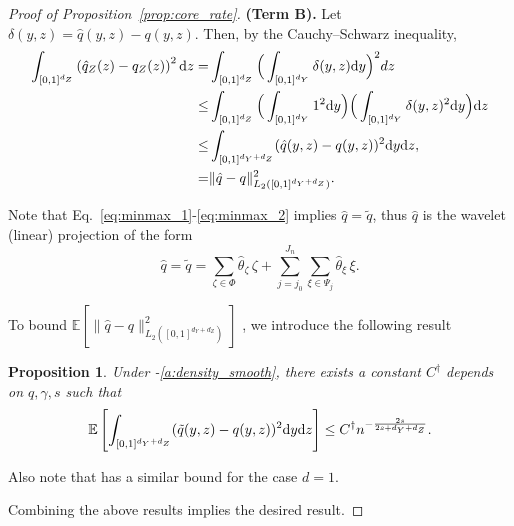 \documentclass{article}
\theoremstyle{plain}
\newtheorem{proposition}{Proposition}[section]
\theoremstyle{definition}
\def\EE{\mathbb{E}}
\theoremstyle{plain}
\newcommand{\diff}{{\rm d}}
\def\EE{\mathbb{E}}
\begin{document}
\begin{proof}[Proof of Proposition~\ref{prop:core_rate}]
    \medskip
    \noindent
    \textbf{(Term B).}
    Let $\delta(y,z)=\hat q(y,z)-q(y,z)$. Then, by the Cauchy–Schwarz inequality,
    \begin{align*}
        \int_{[0,1]^{d_Z}}  \left(\hat q_Z(z) - q_Z(z)\right)^2  \diff z
        = & \int_{[0,1]^{d_Z}} \Big(\int_{[0,1]^{d_Y}} \delta(y,z) \diff y\Big)^2 dz\\
    \le & \int_{[0,1]^{d_Z}} \Big(\int_{[0,1]^{d_Y}} 1^2 \diff y\Big)\Big(\int_{[0,1]^{d_Y}} \delta(y,z)^2\diff y\Big)\diff z\\
    \le & \int_{[0,1]^{d_Y + d_Z}} (\hat q(y,z)-q(y,z))^2  \diff y \diff z,\\
    =& \|\hat q - q\|^2_{L_2([0,1]^{d_Y + d_Z})}.
    \end{align*}
    

    Note that Eq.~\eqref{eq:minmax_1}-\eqref{eq:minmax_2} implies $\hat q = \tilde q$, thus $\hat q$ is the wavelet (linear) projection of the form
    \[
        \hat q = \tilde q = \sum_{\zeta\in\Phi}\widehat \theta_\zeta\,\zeta
+
\sum_{j=j_0}^{J_n}\sum_{\xi\in\Psi_j}\widehat \theta_\xi\,\xi.
    \]

    To bound $\EE\left[\|\hat q - q\|^2_{L_2([0,1]^{d_Y + d_Z})}\right]$ , we introduce the following result
    \begin{proposition}\label{prop:L2-bound}
    Under -\ref{a:density_smooth}, there exists a constant $C^\dagger$ depends on $q, \gamma, s$ such that
    \[
        \EE\left[\int_{[0,1]^{d_Y + d_Z}} (\tilde q(y,z)-q(y,z))^2  \diff y \diff z\right] \leq C^\dagger n^{-\frac{2s}{2s+d_Y+d_Z}}.
    \]
    \end{proposition}
    Also note that \parencite{hardle2012wavelets} has a similar bound for the case $d = 1$.

    Combining the above results implies the desired result. 
    \end{proof}
\end{document}
